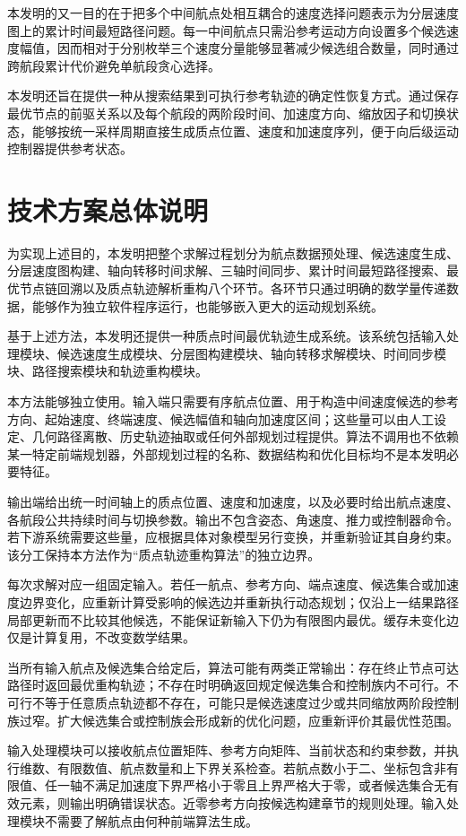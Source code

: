 \documentclass[UTF8,a4paper,12pt,fontset=fandol]{ctexart}
\begin{document}
本发明的又一目的在于把多个中间航点处相互耦合的速度选择问题表示为分层速度图上的累计时间最短路径问题。每一中间航点只需沿参考运动方向设置多个候选速度幅值，因而相对于分别枚举三个速度分量能够显著减少候选组合数量，同时通过跨航段累计代价避免单航段贪心选择。

本发明还旨在提供一种从搜索结果到可执行参考轨迹的确定性恢复方式。通过保存最优节点的前驱关系以及每个航段的两阶段时间、加速度方向、缩放因子和切换状态，能够按统一采样周期直接生成质点位置、速度和加速度序列，便于向后级运动控制器提供参考状态。

\section{技术方案总体说明}

为实现上述目的，本发明把整个求解过程划分为航点数据预处理、候选速度生成、分层速度图构建、轴向转移时间求解、三轴时间同步、累计时间最短路径搜索、最优节点链回溯以及质点轨迹解析重构八个环节。各环节只通过明确的数学量传递数据，能够作为独立软件程序运行，也能够嵌入更大的运动规划系统。

基于上述方法，本发明还提供一种质点时间最优轨迹生成系统。该系统包括输入处理模块、候选速度生成模块、分层图构建模块、轴向转移求解模块、时间同步模块、路径搜索模块和轨迹重构模块。

本方法能够独立使用。输入端只需要有序航点位置、用于构造中间速度候选的参考方向、起始速度、终端速度、候选幅值和轴向加速度区间；这些量可以由人工设定、几何路径离散、历史轨迹抽取或任何外部规划过程提供。算法不调用也不依赖某一特定前端规划器，外部规划过程的名称、数据结构和优化目标均不是本发明必要特征。

输出端给出统一时间轴上的质点位置、速度和加速度，以及必要时给出航点速度、各航段公共持续时间与切换参数。输出不包含姿态、角速度、推力或控制器命令。若下游系统需要这些量，应根据具体对象模型另行变换，并重新验证其自身约束。该分工保持本方法作为“质点轨迹重构算法”的独立边界。

每次求解对应一组固定输入。若任一航点、参考方向、端点速度、候选集合或加速度边界变化，应重新计算受影响的候选边并重新执行动态规划；仅沿上一结果路径局部更新而不比较其他候选，不能保证新输入下仍为有限图内最优。缓存未变化边仅是计算复用，不改变数学结果。

当所有输入航点及候选集合给定后，算法可能有两类正常输出：存在终止节点可达路径时返回最优重构轨迹；不存在时明确返回规定候选集合和控制族内不可行。不可行不等于任意质点轨迹都不存在，可能只是候选速度过少或共同缩放两阶段控制族过窄。扩大候选集合或控制族会形成新的优化问题，应重新评价其最优性范围。

输入处理模块可以接收航点位置矩阵、参考方向矩阵、当前状态和约束参数，并执行维数、有限数值、航点数量和上下界关系检查。若航点数小于二、坐标包含非有限值、任一轴不满足加速度下界严格小于零且上界严格大于零，或者候选集合无有效元素，则输出明确错误状态。近零参考方向按候选构建章节的规则处理。输入处理模块不需要了解航点由何种前端算法生成。
\end{document}
